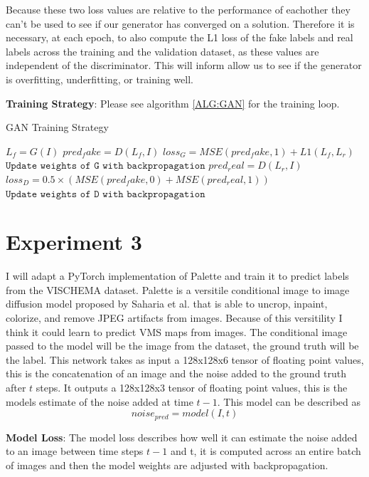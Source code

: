 \documentclass{UoYCSproject}
\begin{document}
Because these two loss values are relative to the performance of eachother they can't be used to see if our generator has converged on a solution. Therefore it is necessary, at each epoch, to also compute the L1 loss of the fake labels and real labels across the training and the validation dataset, as these values are independent of the discriminator. This will inform allow us to see if the generator is overfitting, underfitting, or training well. 

\textbf{Training Strategy}: Please see algorithm \ref{ALG:GAN} for the training loop.

\begin{algorithm}
\caption{GAN Training Strategy}\label{ALG:GAN}
\begin{algorithmic}[1]
\State
\State $L_{f} = G(I)$
\State
\State $pred_fake = D(L_{f}, I) $
\State $loss_G = MSE( pred_fake, 1 ) + L1(L_{f}, L_{r}) $
\State $\texttt{Update weights of G with backpropagation}$
\State
\State $pred_real = D(L_{r}, I)$
\State $loss_D = 0.5 \times  ( MSE( pred_fake, 0) + MSE( pred_real, 1) ) $
\State $\texttt{Update weights of D with backpropagation}$
\State
\EndFor
\EndFor
\end{algorithmic}
\end{algorithm}

\section{Experiment 3}

I will adapt a PyTorch implementation of Palette \cite{JanspiryPalette} and train it to predict labels from the VISCHEMA dataset. Palette is a versitile conditional image to image diffusion model proposed by Saharia et al. \cite{saharia2022palette} that is able to uncrop, inpaint, colorize, and remove JPEG artifacts from images. Because of this versitility I think it could learn to predict VMS maps from images. The conditional image passed to the model will be the image from the dataset, the ground truth will be the label. This network takes as input a 128x128x6 tensor of floating point values, this is the concatenation of an image and the noise added to the ground truth after $t$ steps. It outputs a 128x128x3 tensor of floating point values, this is the models estimate of the noise added at time $t-1$.
This model can be described as \[ noise_{pred} = model(I, t) \]

\textbf{Model Loss}: The model loss describes how well it can estimate the noise added to an image between time steps $t-1$ and t, it is computed across an entire batch of images and then the model weights are adjusted with backpropagation.
\end{document}
